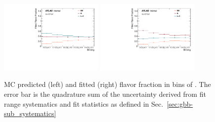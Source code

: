 \begin{figure}[htbp]
  \centering
 \includegraphics[width=0.45\textwidth]{figures/gbb/Sub_Sd0_Fits/Canv_ZpT_FitFrac_Original.pdf}
 \includegraphics[width=0.45\textwidth]{figures/gbb/Sub_Sd0_Fits/Canv_ZpT_FitFrac_Corrected.pdf}

\caption{MC predicted (left) and fitted (right) flavor fraction in bins of \zpt. The error bar is the quadrature sum of the uncertainty derived from fit range systematics and fit statistics as defined in Sec.~\ref{sec:gbb-sub_systematics}}
  \label{fig:ZpT-fitfrac}
\end{figure}

